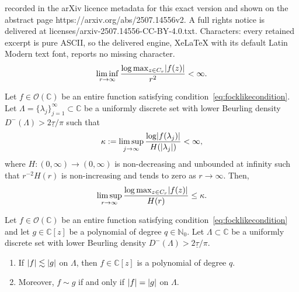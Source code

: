 \documentclass[10pt,a4paper]{amsart}
\DeclarePairedDelimiter{\abs}{\lvert}{\rvert}
\newcommand{\bbC}{\mathbb{C}}
\newcommand{\bbN}{\mathbb{N}}
\newcommand{\calO}{\mathcal{O}}
\begin{document}
recorded in the arXiv licence metadata for this exact version and shown on the abstract page https://arxiv.org/abs/2507.14556v2. A full rights notice is delivered at licenses/arxiv-2507.14556-CC-BY-4.0.txt. Characters: every retained excerpt is pure ASCII, so the delivered engine, XeLaTeX with its default Latin Modern text font, reports no missing character.
    \begin{equation}
        \liminf_{r \to \infty} \frac{\log \max_{z \in C_r} \abs{f(z)}}{r^2} < \infty. \label{eq:focklikecondition}
    \end{equation}

    \begin{theorem}\label{thm:Earl}
        Let $f \in \calO(\bbC)$ be an entire function satisfying condition~\eqref{eq:focklikecondition}. Let $\Lambda = \lbrace \lambda_j \rbrace_{j = 1}^\infty \subset \bbC$ be a uniformly discrete set with lower Beurling density $D^{-}(\Lambda) > 2 \underline \tau / \pi$ such that 
        \begin{equation*}
            \kappa := \limsup_{j \to \infty} \frac{\log \abs{f(\lambda_j)}}{H(\abs{\lambda_j})} < \infty,
        \end{equation*}
        where $H : (0,\infty) \to (0,\infty)$ is non-decreasing and unbounded at infinity such that $r^{-2} H(r)$ is non-increasing and tends to zero as $r \to \infty$. Then, 
        \begin{equation*}
            \limsup_{r \to \infty} \frac{\log \max_{z \in C_r} \abs{f(z)}}{H(r)} \leq \kappa.
        \end{equation*}
    \end{theorem}

    \begin{proposition}\label{prop:PolynomialProposition}
        Let $f \in \calO(\bbC)$ be an entire function satisfying condition~\eqref{eq:focklikecondition} and let $g \in \bbC[z]$ be a polynomial of degree $q \in \bbN_0$. Let $\Lambda \subset \bbC$ be a uniformly discrete set with lower Beurling density $D^{-}(\Lambda) > 2 \underline \tau / \pi$. 
        \begin{enumerate}
            \item If $\abs{f} \lesssim \abs{g}$ on $\Lambda$, then $f \in \bbC[z]$ is a polynomial of degree $q$.
            \item Moreover, $f \sim g$ if and only if $\abs{f} = \abs{g}$ on $\Lambda$.
        \end{enumerate}
    \end{proposition}
\end{document}

